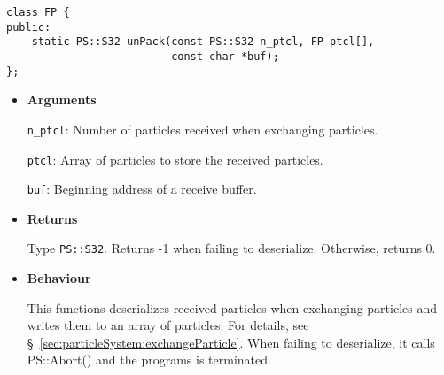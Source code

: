 
\begin{screen}
\begin{verbatim}
class FP {
public:
    static PS::S32 unPack(const PS::S32 n_ptcl, FP ptcl[],
                          const char *buf);
};
\end{verbatim}
\end{screen}

\begin{itemize}

\item {\bf Arguments}

  \texttt{n\_ptcl}: Number of particles received when exchanging particles. 
  
  \texttt{ptcl}: Array of particles to store the received particles. 
  
  \texttt{buf}: Beginning address of a receive buffer.

\item {\bf Returns}

  Type \texttt{PS::S32}. Returns -1 when failing to deserialize. Otherwise, returns 0.

\item {\bf Behaviour}

 This functions deserializes received particles when exchanging particles and writes them to an array of particles. For details, see \S~\ref{sec:particleSystem:exchangeParticle}. When failing to deserialize, it calls PS::Abort() and the programs is terminated.

\end{itemize}
